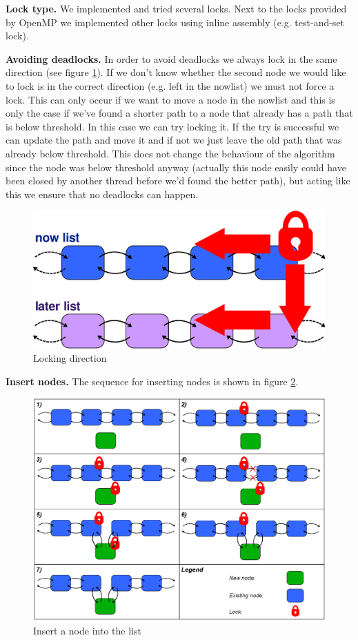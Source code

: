 \documentclass[letterpaper]{article}
\newcommand{\mypar}[1]{{\bf #1.}}
\begin{document}
\mypar{Lock type}
We implemented and tried several locks. Next to the locks provided by OpenMP we implemented other locks using inline assembly (e.g. test-and-set lock). 

\mypar{Avoiding deadlocks}
In order to avoid deadlocks we always lock in the same direction (see figure \ref{fig:lock}). If we don't know whether the second node we would like to lock is in the correct direction (e.g. left in the nowlist) we must not force a lock. This can only occur if we want to move a node in the nowlist and this is only the case if we've found a shorter path to a node that already has a path that is below threshold. In this case we can try locking it. If the try is successful we can update the path and move it and if not we just leave the old path that was already below threshold. This does not change the behaviour of the algorithm since the node was below threshold anyway (actually this node easily could have been closed by another thread before we'd found the better path), but acting like this we ensure that no deadlocks can happen.

\begin{figure}[h]\centering
  \includegraphics[scale=0.38]{locking.eps}
  \caption{Locking direction \label{fig:lock}}
\end{figure}

\mypar{Insert nodes}
The sequence for inserting nodes is shown in figure \ref{fig:insert}.

\begin{figure}[h]\centering
  \includegraphics[scale=0.31]{insert.eps}
  \caption{Insert a node into the list \label{fig:insert}}
\end{figure}
\end{document}
